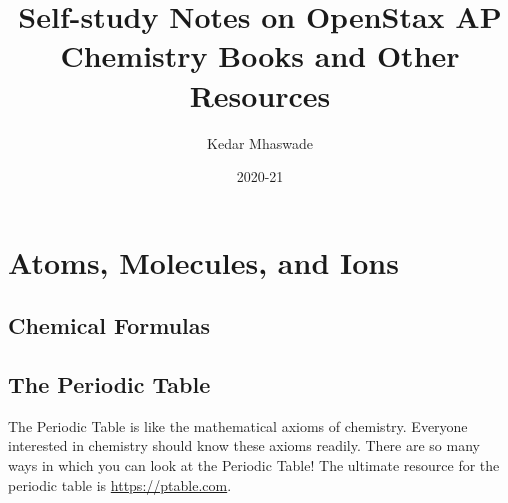 \documentclass{article}
\begin{document}
\title{Self-study Notes on OpenStax AP Chemistry Books and Other Resources}
\author{Kedar Mhaswade}
\date{2020-21}
\maketitle
\listoftodos
\section{Atoms, Molecules, and Ions}
\label{sec: a-m-i}
\subsection{Chemical Formulas}
\label{sec: chem-form}
\subsection{The Periodic Table}
\label{sec: pt}
The Periodic Table is like the mathematical axioms of chemistry. Everyone interested in chemistry should know these axioms readily. There are so many ways in which you can look at the Periodic Table! The ultimate resource for the periodic table is \url{https://ptable.com}.
\end{document}
